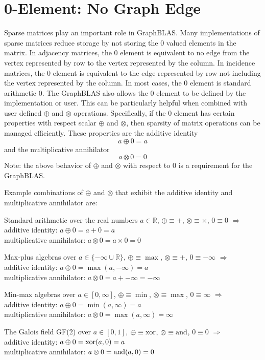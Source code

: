 \section{0-Element: No Graph Edge}
  Sparse matrices play an important role in GraphBLAS.  Many implementations of sparse matrices reduce storage by not storing the 0 valued elements in the matrix.  In adjacency matrices, the 0 element is equivalent to no edge from the vertex represented by row to the vertex represented by the column. In incidence matrices, the 0 element is equivalent to the edge represented by row not including the vertex represented by the column.  In most cases, the 0 element is standard arithmetic 0.  The GraphBLAS also allows the 0 element to be defined by the implementation or user.  This can be particularly helpful when combined with user defined $\oplus$ and $\otimes$ operations.  Specifically, if the 0 element has certain properties with respect scalar $\oplus$ and $\otimes$, then sparsity of matrix operations can be managed efficiently.  These properties are the additive identity
$$
     a \oplus 0 = a
$$
and the multiplicative annihilator
$$
     a \otimes 0 = 0
$$
Note: the above behavior of $\oplus$ and $\otimes$ with respect to 0 is a requirement for the GraphBLAS.

  Example combinations of $\oplus$ and $\otimes$ that exhibit the additive identity and multiplicative annihilator are:

Standard arithmetic over the real numbers $a \in \mathbb{R}$, 
$\oplus \equiv +$, $\otimes \equiv \times$, $0 \equiv 0$ $\Rightarrow$ \\
additive identity: $a \oplus 0  =  a + 0 = a$ \\
multiplicative annihilator: $a \otimes 0 = a \times 0 = 0$

Max-plus algebras over $a \in \{-\infty \cup \mathbb{R}\}$, $\oplus \equiv \max$, $\otimes \equiv +$, $0 \equiv -\infty$ $\Rightarrow$ \\
additive identity: $a \oplus 0  =  \max(a,-\infty) = a$ \\
multiplicative annihilator: $a \otimes 0 = a + -\infty = -\infty$

Min-max algebras over $a \in [0,\infty]$, $\oplus \equiv \min$, $\otimes \equiv \max$, $0 \equiv \infty$ $\Rightarrow$ \\
additive identity: $a \oplus 0  =  \min(a,\infty) = a$ \\
multiplicative annihilator: $a \otimes 0 = \max(a,\infty) = \infty$

The Galois field GF(2) over $a \in [0,1]$, $\oplus \equiv {\rm xor}$, $\otimes \equiv {\rm and}$, $0 \equiv 0$ $\Rightarrow$ \\
additive identity: $a \oplus 0  = {\rm xor}(a,0) = a$ \\
multiplicative annihilator: $a \otimes 0 = {\rm and}(a,0) = 0$

